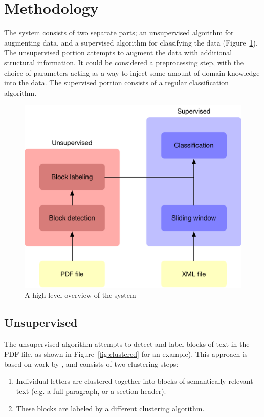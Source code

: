 \section{Methodology}

The system consists of two separate parts; an unsupervised algorithm for
augmenting data, and a supervised algorithm for classifying the data
(Figure~\ref{fig:overview}). The unsupervised portion attempts to augment the
data with additional structural information. It could be considered a
preprocessing step, with the choice of parameters acting as a way to inject some
amount of domain knowledge into the data. The supervised portion consists of a
regular classification algorithm. 

\begin{figure}[htb]
  \centering
  \includegraphics[width=\textwidth]{figures/layout.pdf}
  \caption{A high-level overview of the system}
  \label{fig:overview}
\end{figure}

\subsection{Unsupervised}
The unsupervised algorithm attempts to detect and label blocks of text in the
PDF file, as shown in Figure~\ref{fig:clustered} for an example). This approach
is based on work by \textcite{klampfl2014unsupervised}, and consists of two
clustering steps:
\begin{enumerate}
\item Individual letters are clustered together into blocks of semantically
  relevant text (e.g. a full paragraph, or a section header).
\item These blocks are labeled by a different clustering algorithm.
\end{enumerate}

